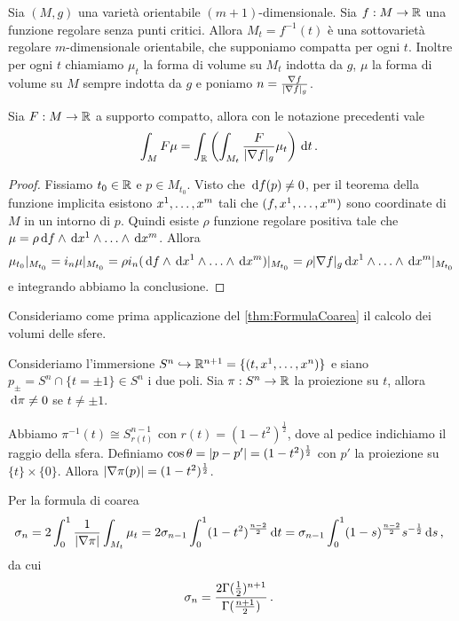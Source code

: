 Sia $(M,g)$ una varietà orientabile $(m+1)$-dimensionale. Sia $f:M \to \R$ una funzione regolare senza punti critici. Allora $M_t = f^{-1} (t)$ è una sottovarietà regolare $m$-dimensionale orientabile, che supponiamo compatta per ogni $t$.
Inoltre per ogni $t$ chiamiamo $\mu_t$ la forma di volume su $M_t$ indotta da $g$, $\mu$ la forma di volume su $M$ sempre indotta da $g$ e poniamo $n = \frac{\grad f}{\abs{\grad f}_g}$.

\begin{theorem}  \label{thm:FormulaCoarea} 
Sia $F:M \to \R$ a supporto compatto, allora con le notazione precedenti vale
\begin{equation*}
	\int_M F \mu = \int_\R \left( \int_{M_t} \frac F{\abs{\grad f}_g} \mu_t \right) \de t \punto
\end{equation*}
\end{theorem}

\begin{proof}
	Fissiamo $t_0\in\R$ e $p\in M_{t_0}$. Visto che $\de f(p) \not = 0$, per il teorema della funzione implicita esistono $\seqa xm,$ tali che $(f, \seqa xm,)$ sono coordinate di $M$ in un intorno di $p$.
	Quindi esiste $\rho$ funzione regolare positiva tale che $\mu = \rho \de f \wedge \seqa {\de x}m\wedge$. Allora
	\begin{equation*}
		\mu_{t_0} \restrict{M_{t_0}} = i_n \mu \restrict{M_{t_0}} = \rho i_n (\de f \wedge \seqa {\de x}m\wedge)\restrict{M_{t_0}} = \rho \abs{\grad f}_g \seqa {\de x}m\wedge \restrict{M_{t_0}}
	\end{equation*}
	e integrando abbiamo la conclusione.
\end{proof}

Consideriamo come prima applicazione del \cref{thm:FormulaCoarea} il calcolo dei volumi delle sfere.

Consideriamo l'immersione $S^n \hookrightarrow \R^{n+1} = \{(t,\seqa xn,)\}$ e siano $p_\pm = S^n\cap\{t=\pm 1\} \in S^n$ i due poli. Sia $\pi:S^n \to \R$ la proiezione su $t$, allora $\de \pi \not=0$ se $t\not=\pm 1$.

Abbiamo $\pi^{-1}(t) \cong S^{n-1}_{r(t)}$ con $r(t) = (1-t^2)^{\frac 12}$, dove al pedice indichiamo il raggio della sfera.
Definiamo $\cos\theta = \abs{p-p'} = (1-t^2)^{\frac 12}$ con $p'$ la proiezione su $\{t\}\times \{0\}$. Allora $\abs{\grad \pi(p)} = (1-t^2)^{\frac 12}$.

Per la formula di coarea
\begin{equation*}
	\sigma_n = 2\int_0^1 \frac 1{\abs{\grad \pi}} \int_{M_t} \mu_t = 2\sigma_{n-1} \int_0^1 (1-t^2)^{\frac{n-2}{2}} \de t = \sigma_{n-1} \int_0^1 (1-s)^{\frac{n-2}{2}} s^{-\frac 12} \de s \virgola
\end{equation*}
da cui 
\begin{equation*}
	\sigma_n = \frac{2\Gamma(\frac 12)^{n+1}}{\Gamma(\frac{n+1}2)} \punto
\end{equation*}

